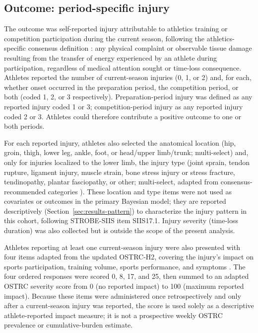 \subsection{Outcome: period-specific injury}
\label{sec:outcome}
The outcome was self-reported injury attributable to athletics training or competition participation during the current season, following the athletics-specific consensus definition \citep{bahr2020strobesiis,timpka2014consensus}: any physical complaint or observable tissue damage resulting from the transfer of energy experienced by an athlete during participation, regardless of medical attention sought or time-loss consequence. Athletes reported the number of current-season injuries (0, 1, or 2) and, for each, whether onset occurred in the preparation period, the competition period, or both (coded 1, 2, or 3 respectively). Preparation-period injury was defined as any reported injury coded 1 or 3; competition-period injury as any reported injury coded 2 or 3. Athletes could therefore contribute a positive outcome to one or both periods.

For each reported injury, athletes also selected the anatomical location (hip, groin, thigh, lower leg, ankle, foot, or head/upper limb/trunk; multi-select) and, only for injuries localized to the lower limb, the injury type (joint sprain, tendon rupture, ligament injury, muscle strain, bone stress injury or stress fracture, tendinopathy, plantar fasciopathy, or other; multi-select, adapted from consensus-recommended categories \citep{bahr2020strobesiis}). These location and type items were not used as covariates or outcomes in the primary Bayesian model; they are reported descriptively (Section~\ref{sec:results-pattern}) to characterize the injury pattern in this cohort, following STROBE-SIIS item SIIS17.1. Injury severity (time-loss duration) was also collected but is outside the scope of the present analysis.

Athletes reporting at least one current-season injury were also presented with four items adapted from the updated OSTRC-H2, covering the injury's impact on sports participation, training volume, sports performance, and symptoms \citep{clarsen2014ostrch,clarsen2020ostrc}. The four ordered responses were scored 0, 8, 17, and 25, then summed to an adapted OSTRC severity score from 0 (no reported impact) to 100 (maximum reported impact). Because these items were administered once retrospectively and only after a current-season injury was reported, the score is used solely as a descriptive athlete-reported impact measure; it is not a prospective weekly OSTRC prevalence or cumulative-burden estimate.

